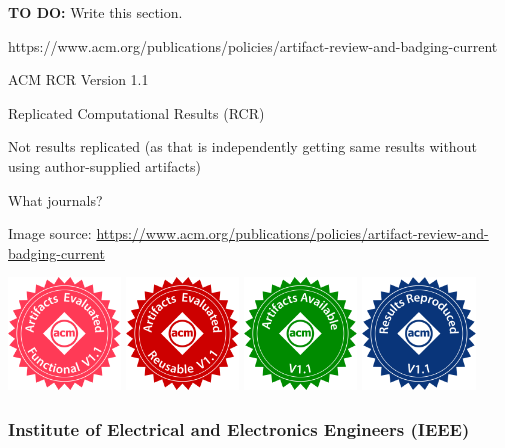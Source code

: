 \textbf{TO DO:} Write this section.

https://www.acm.org/publications/policies/artifact-review-and-badging-current

ACM RCR Version 1.1

Replicated Computational Results (RCR)

Not results replicated (as that is independently getting same results without using author-supplied artifacts)

What journals?

Image source: \url{https://www.acm.org/publications/policies/artifact-review-and-badging-current}

\includegraphics[width=3cm]{images/artifacts_evaluated_functional_v1_1.png}
\includegraphics[width=3cm]{images/artifacts_evaluated_reusable_v1_1.png}
\includegraphics[width=3cm]{images/artifacts_available_v1_1.png}
\includegraphics[width=3cm]{images/results_reproduced_v1_1.png}

\subsubsection{Institute of Electrical and Electronics Engineers (IEEE)}

